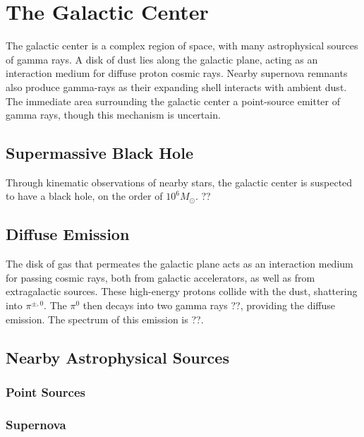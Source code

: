 \cleartooddpage[\thispagestyle{empty}]
\chapter{The Galactic Center}

The galactic center is a complex region of space, with many astrophysical sources of gamma rays.
A disk of dust lies along the galactic plane, acting as an interaction medium for diffuse proton cosmic rays.
Nearby supernova remnants also produce gamma-rays as their expanding shell interacts with ambient dust.
The immediate area surrounding the galactic center a point-source emitter of gamma rays, though this mechanism is uncertain.

\section{Supermassive Black Hole}

Through kinematic observations of nearby stars, the galactic center is suspected to have a black hole, on the order of $10^6 M_{\odot}$. ??

\section{Diffuse Emission}
The disk of gas that permeates the galactic plane acts as an interaction medium for passing cosmic rays, both from galactic accelerators, as well as from extragalactic sources.
These high-energy protons collide with the dust, shattering into $\pi^{\pm,0}$.
The $\pi^0$ then decays into two gamma rays ??, providing the diffuse emission.
The spectrum of this emission is ??.

\section{Nearby Astrophysical Sources}

\subsection{Point Sources}

\subsection{Supernova}

